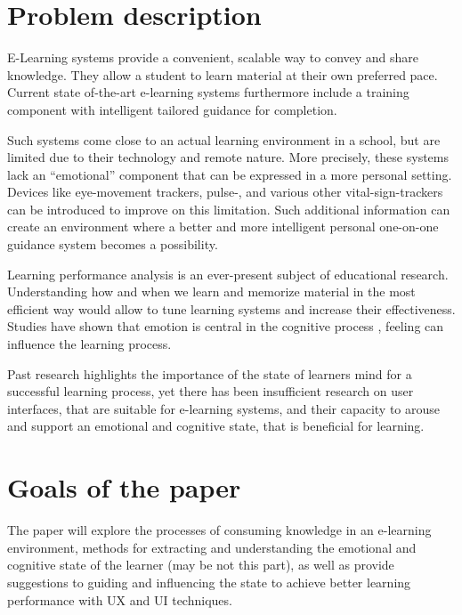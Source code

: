 \section {Problem description}

E-Learning systems provide a convenient, scalable way to convey and share knowledge. They allow a student to learn material at their own preferred pace. 
Current state of-the-art e-learning systems furthermore include a training component with intelligent tailored guidance for completion. 

Such systems come close to an actual learning environment in a school, but are limited due to their technology and remote nature. More precisely, these systems lack an “emotional” component that can be expressed in a more personal setting. Devices like eye-movement trackers, pulse-, and various other vital-sign-trackers can be introduced to improve on this limitation. Such additional information can create an environment where a better and more intelligent personal one-on-one guidance system becomes a possibility.

Learning performance analysis is an ever-present subject of educational research. Understanding how and when we learn and memorize material in the most efficient way would allow to tune learning systems and increase their effectiveness. Studies have shown that emotion is central in the cognitive process \cite{ORegan2003}, feeling can influence the learning process. \cite{Hawkins2017} 

Past research highlights the importance of the state of learners mind for a successful learning process, yet there has been insufficient research on user interfaces, that are suitable for e-learning systems, and their capacity to arouse and support an emotional and cognitive state, that is beneficial for learning.


\section{Goals of the paper}

The paper will explore the processes of consuming knowledge in an e-learning environment, methods for extracting and understanding the emotional and cognitive state of the learner (may be not this part), as well as provide suggestions to guiding and influencing the state to achieve better learning performance with UX and UI techniques.

